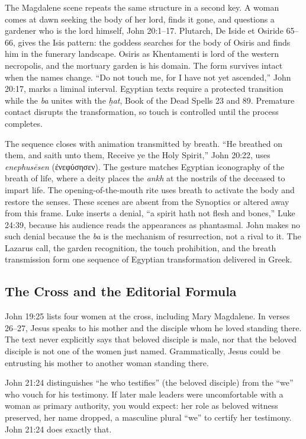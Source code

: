 The Magdalene scene repeats the same structure in a second key.
A woman comes at dawn seeking the body of her lord, finds it gone, and questions a gardener who is the lord himself, John 20:1--17.
Plutarch, De Iside et Osiride 65--66, gives the Isis pattern: the goddess searches for the body of Osiris and finds him in the funerary landscape.
Osiris as Khentamenti is lord of the western necropolis, and the mortuary garden is his domain.
The form survives intact when the names change.
``Do not touch me, for I have not yet ascended,'' John 20:17, marks a liminal interval.
Egyptian texts require a protected transition while the \emph{ba} unites with the \emph{ḫat}, Book of the Dead Spells 23 and 89.
Premature contact disrupts the transformation, so touch is controlled until the process completes.

The sequence closes with animation transmitted by breath.
``He breathed on them, and saith unto them, Receive ye the Holy Spirit,'' John 20:22, uses \emph{enephusēsen} (ἐνεφύσησεν).
The gesture matches Egyptian iconography of the breath of life, where a deity places the \emph{ankh} at the nostrils of the deceased to impart life.
The opening-of-the-mouth rite uses breath to activate the body and restore the senses.
These scenes are absent from the Synoptics or altered away from this frame.
Luke inserts a denial, ``a spirit hath not flesh and bones,'' Luke 24:39, because his audience reads the appearances as phantasmal.
John makes no such denial because the \emph{ba} is the mechanism of resurrection, not a rival to it.
The Lazarus call, the garden recognition, the touch prohibition, and the breath transmission form one sequence of Egyptian transformation delivered in Greek.

\subsection{The Cross and the Editorial Formula}\label{subsec:cross-editorial-formula}

John 19:25 lists four women at the cross, including Mary Magdalene.
In verses 26--27, Jesus speaks to his mother and the disciple whom he loved standing there.
The text never explicitly says that beloved disciple is male, nor that the beloved disciple is not one of the women just named.
Grammatically, Jesus could be entrusting his mother to another woman standing there.

John 21:24 distinguishes ``he who testifies'' (the beloved disciple) from the ``we'' who vouch for his testimony.
If later male leaders were uncomfortable with a woman as primary authority, you would expect: her role as beloved witness preserved, her name dropped, a masculine plural ``we'' to certify her testimony.
John 21:24 does exactly that.

